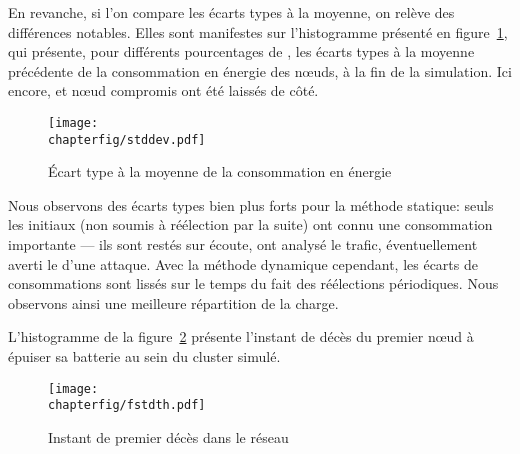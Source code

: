 En revanche, si l'on compare les écarts types à la moyenne, on relève des différences notables.
Elles sont manifestes sur l'histogramme présenté en figure~\ref{sa:fig:conso-ecart-type}, qui présente, pour différents pourcentages de \cns, les écarts types à la moyenne précédente de la consommation en énergie des nœuds, à la fin de la simulation.
Ici encore, \ch et nœud compromis ont été laissés de côté.
\begin{figure}[H]
    \centering
    \texttt{[image: \\chapterfig/stddev.pdf]}
    \caption{Écart type à la moyenne de la consommation en énergie}\label{sa:fig:conso-ecart-type}
\end{figure}
Nous observons des écarts types bien plus forts pour la méthode statique: seuls les \cns initiaux (non soumis à réélection par la suite) ont connu une consommation importante --- ils sont restés sur écoute, ont analysé le trafic, éventuellement averti le \ch d'une attaque.
Avec la méthode dynamique cependant, les écarts de consommations sont lissés sur le temps du fait des réélections périodiques.
Nous observons ainsi une meilleure répartition de la charge.

L'histogramme de la figure~\ref{sa:fig:premier-deces} présente l'instant de décès du premier nœud à épuiser sa batterie au sein du cluster simulé.
\begin{figure}[H]
    \centering
    \texttt{[image: \\chapterfig/fstdth.pdf]}
    \caption{Instant de premier décès dans le réseau}\label{sa:fig:premier-deces}
\end{figure}

